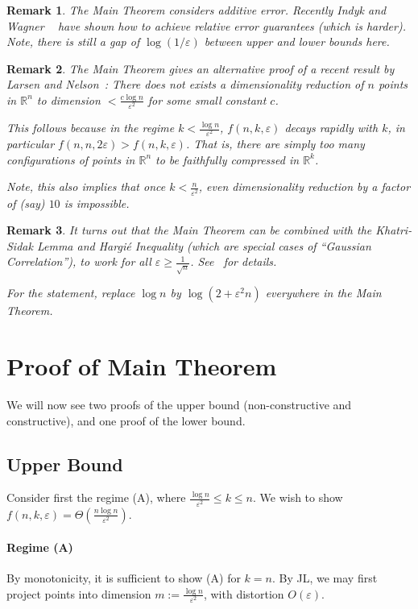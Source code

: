 \documentclass[11pt]{article}
\newcommand{\eps}{\varepsilon}
\newcommand{\R}{\mathbb{R}}
\newcommand{\1}{\mathbbm{1}}
\newtheorem{remark}{Remark}
\begin{document}
\begin{remark}
    The Main Theorem considers \emph{additive} error.
    Recently Indyk and Wagner ~\cite{indyk}
    have shown how to achieve \emph{relative} error guarantees (which is harder).
    Note, there is still a gap of $\log(1/\eps)$ between upper and lower bounds here.
\end{remark}
\begin{remark}
The Main Theorem gives an alternative proof of a recent result by Larsen and
Nelson~\cite{larsen}:
There does not exists a dimensionality reduction of $n$ points in $\R^n$
to dimension $< \frac{c\log n}{\eps^2}$ for some small constant $c$.

This follows because in the regime $k < \frac{\log n}{\eps^2}$,
$f(n, k, \eps)$ decays rapidly with $k$, in particular
$f(n, n, 2\eps) > f(n, k, \eps)$.
That is, there are simply too many configurations of points in $\R^n$
to be faithfully compressed in $\R^k$.

Note, this also implies that once $k < \frac{n}{\eps^2}$, even dimensionality
reduction by a factor of (say) $10$ is impossible.
\end{remark}

\begin{remark}
    It turns out that the Main Theorem can be combined with the
    \emph{Khatri-Sidak Lemma} and \emph{Hargi\'e Inequality}
    (which are special cases of ``Gaussian Correlation''),
    to work for all $\eps \geq \frac{1}{\sqrt{n}}$.
    See~\cite{alonFOCS} for details.

    For the statement, replace $\log n$ by $\log(2+\eps^2 n)$ everywhere in the
    Main Theorem.
\end{remark}

\section{Proof of Main Theorem}
We will now see two proofs of the upper bound (non-constructive and
constructive), and one proof of the lower bound.

\subsection{Upper Bound}
Consider first the regime (A),
where $\frac{\log n}{\eps^2} \leq k \leq n$.
We wish to show $f(n, k, \eps) = \Theta(\frac{n\log n}{\eps^2})$.

\paragraph{Regime (A)}
By monotonicity, it is sufficient to show (A) for $k = n$.
By JL, we may first project points into dimension $m := \frac{\log n}{\eps^2}$,
with distortion $O(\eps)$.
\end{document}
